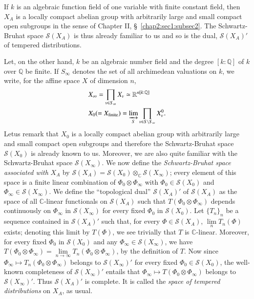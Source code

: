 If $k$ is an algebraic function field of one variable with finite
constant field, then $X_{A}$ is a locally compact abelian group with
arbitrarily large and small compact open subgroups in the sense of
Chapter II, \S\ \ref{chap2:sec1:subsec2}. The Schwartz-Bruhat space $\mathscr{S}(X_{A})$
is thus already familiar to us and so is the dual, $\mathscr{S}(X_{A})'$ of
tempered distributions.

Let, on the other hand, $k$ be an algebraic number field and the
degree $[k:\mathbb{Q}]$ of $k$ over $\mathbb{Q}$ be finite. If
$S_{\infty}$ denotes the set of all archimedean valuations on $k$, we
write, for the affine space $X$ of dimension $n$,
\begin{align*}
& X_{\infty}=\prod_{v\in S_{\infty}}X_{v}\simeq
\mathbb{R}^{n[k:\mathbb{Q}]}\\
& X_{0}(=X_{\text{finite}})=\varinjlim_{S} \prod_{v\in S\backslash
  S_{\infty}}X^{0}_{v}. 
\end{align*}
Let\pageoriginale us remark that $X_{0}$ is a locally compact abelian
group with arbitrarily large and small compact open subgroups and
therefore the Schwartz-Bruhat space $\mathscr{S}(X_{0})$ is already known
to us. Moreover, we are also quite familiar with the Schwartz-Bruhat
space $\mathscr{S}(X_{\infty})$. We now define the {\em Schwartz-Bruhat
  space associated with} $X_{A}$ by
$\mathscr{S}(X_{A})=\mathscr{S}(X_{0})\otimes_{\mathbb{C}}\mathscr{S}(X_{\infty})$;
every element of this space is a finite linear combination of
$\Phi_{0}\otimes \Phi_{\infty}$ with $\Phi_{0}\in\mathscr{S}(X_{0})$ and
$\Phi_{\infty}\in \mathscr{S}(X_{\infty})$. We define the ``topological
dual'' $\mathscr{S}(X_{A})'$ of $\mathscr{S}(X_{A})$ as the space of all
$\mathbb{C}$-linear functionals on $\mathscr{S}(X_{A})$ such that
$T(\Phi_{0}\otimes \Phi_{\infty})$ depends continuously on
$\Phi_{\infty}$ in $\mathscr{S}(X_{\infty})$ for every fixed $\Phi_{0}$ in
$\mathscr{S}(X_{0})$. Let $\{T_{n}\}_{n}$ be a sequence contained in
$\mathscr{S}(X_{A})'$ such that, for every $\Phi\in \mathscr{S}(X_{A})$,
$\lim\limits_{n}T_{n}(\Phi)$ exists; denoting this limit by $T(\Phi)$,
we see trivially that $T$ is $\mathbb{C}$-linear. Moreover, for every
fixed $\Phi_{0}$ in $\mathscr{S}(X_{0})$ and any $\Phi_{\infty}\in
\mathscr{S}(X_{\infty})$, we have
$T(\Phi_{0}\otimes\Phi_{\infty})=\lim\limits_{n\to
  \infty}T_{n}(\Phi_{0}\otimes\Phi_{\infty})$, by the definition of
$T$. Now since $\Phi_{\infty}\mapsto T_{n}(\Phi_{0}\otimes
\Phi_{\infty})$ belongs to $\mathscr{S}(X_{\infty})'$ for every fixed
$\Phi_{0}\in\mathscr{S}(X_{0})$, the well-known completeness of
$\mathscr{S}(X_{\infty})'$ entails that $\Phi_{\infty}\mapsto
T(\Phi_{0}\otimes \Phi_{\infty})$ belongs to
$\mathscr{S}(X_{\infty})'$. Thus $\mathscr{S}(X_{A})'$ is complete. It is
called the {\em space of tempered distributions} on $X_{A}$, as usual.

